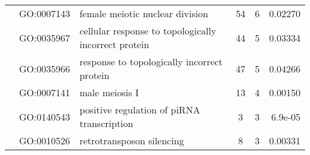 \documentclass[../main.tex]{subfiles}
\begin{document}
\begin{landscape}
\begin{longtable}{@{}lllccr@{}}
		                                               & GO:0007143                         & female meiotic nuclear division                                           & 54                                                                 & 6                                                                    & 0.02270                                                                                  \\
		                                               & GO:0035967                         & cellular response to topologically incorrect protein                      & 44                                                                 & 5                                                                    & 0.03334                                                                                  \\
		                                               & GO:0035966                         & response to topologically incorrect protein                               & 47                                                                 & 5                                                                    & 0.04266                                                                                  \\
		                                               & GO:0007141                         & male meiosis I                                                            & 13                                                                 & 4                                                                    & 0.00150                                                                                  \\
		                                               & GO:0140543                         & positive regulation of piRNA transcription                                & 3                                                                  & 3                                                                    & 6.9e-05                                                                                  \\
		                                               & GO:0010526                         & retrotransposon silencing                                                 & 8                                                                  & 3                                                                    & 0.00331                                                                                  \\

\end{longtable}
\end{landscape}
\end{document}
